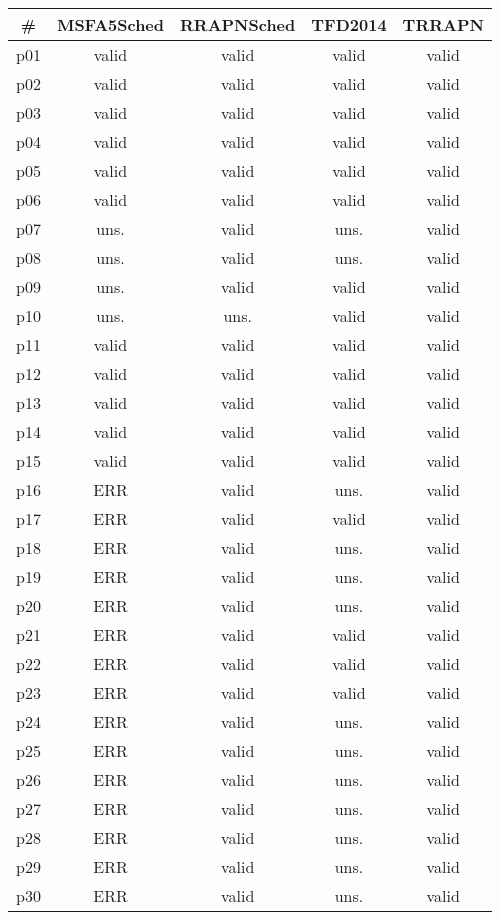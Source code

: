 \begin{tabular}{ccccc}
\toprule
\textbf{\#} & \textbf{MSFA5Sched} & \textbf{RRAPNSched} & \textbf{TFD2014} & \textbf{TRRAPN}\\
\midrule
p01 & valid & valid & valid & valid\\
p02 & valid & valid & valid & valid\\
p03 & valid & valid & valid & valid\\
p04 & valid & valid & valid & valid\\
p05 & valid & valid & valid & valid\\
p06 & valid & valid & valid & valid\\
p07 & uns. & valid & uns. & valid\\
p08 & uns. & valid & uns. & valid\\
p09 & uns. & valid & valid & valid\\
p10 & uns. & uns. & valid & valid\\
p11 & valid & valid & valid & valid\\
p12 & valid & valid & valid & valid\\
p13 & valid & valid & valid & valid\\
p14 & valid & valid & valid & valid\\
p15 & valid & valid & valid & valid\\
p16 & ERR & valid & uns. & valid\\
p17 & ERR & valid & valid & valid\\
p18 & ERR & valid & uns. & valid\\
p19 & ERR & valid & uns. & valid\\
p20 & ERR & valid & uns. & valid\\
p21 & ERR & valid & valid & valid\\
p22 & ERR & valid & valid & valid\\
p23 & ERR & valid & valid & valid\\
p24 & ERR & valid & uns. & valid\\
p25 & ERR & valid & uns. & valid\\
p26 & ERR & valid & uns. & valid\\
p27 & ERR & valid & uns. & valid\\
p28 & ERR & valid & uns. & valid\\
p29 & ERR & valid & uns. & valid\\
p30 & ERR & valid & uns. & valid\\
\bottomrule
\end{tabular}

